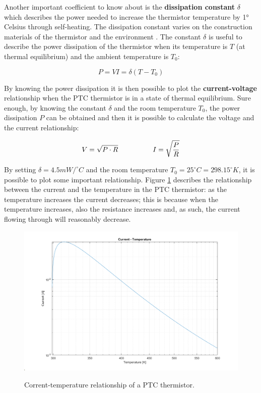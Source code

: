 Another important coefficient to know about is the \textbf{dissipation constant} $\delta$ which describes the power needed to increase the thermistor temperature by 1° Celsius through self-heating. The dissipation constant varies on the construction materials of the thermistor and the environment \cite{Saburi196353}. The constant $\delta$ is useful to describe the power dissipation of the thermistor when its temperature is $T$ (at thermal equilibrium) and the ambient temperature is $T_0$:

\begin{equation*}
    P = VI = \delta(T - T_0)
\end{equation*}

\noindent By knowing the power dissipation it is then possible to plot the \textbf{current-voltage} relationship when the PTC thermistor is in a state of thermal equilibrium. Sure enough, by knowing the constant $\delta$ and the room temperature $T_0$, the power dissipation $P$ can be obtained and then it is possible to calculate the voltage and the current relationship:

\begin{equation*}
    V = \sqrt{P \cdot R} \hspace{50px} I = \sqrt{\frac{P}{R}}
\end{equation*}

\noindent By setting $\delta = 4.5 mW/^{\circ}C$ and the room temperature $T_0 = 25^{\circ}C = 298.15^{\circ} K$, it is possible to plot some important relationship. Figure \ref{fig:PTC_curr-temp} describes the relationship between the current and the temperature in the PTC thermistor: as the temperature increases the current decreases; this is because when the temperature increases, also the resistance increases and, as such, the current flowing through will reasonably decrease.

\begin{figure}[h]
    \centering
    \includegraphics[width = .75\textwidth]{../res/plots/PTC_curr-temp.png}
    \label{fig:PTC_curr-temp}
    \caption{Corrent-temperature relationship of a PTC thermistor.}
\end{figure}

